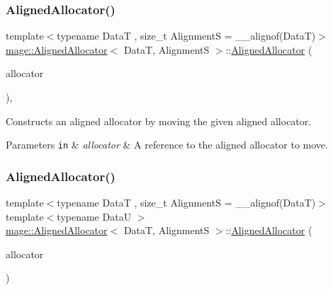 \subsubsection{\texorpdfstring{Aligned\+Allocator()}{AlignedAllocator()}\hspace{0.1cm}{\footnotesize\ttfamily [3/4]}}
{\footnotesize\ttfamily template$<$typename DataT , size\+\_\+t AlignmentS = \+\_\+\+\_\+alignof(\+Data\+T)$>$ \\
\hyperlink{structmage_1_1_aligned_allocator}{mage\+::\+Aligned\+Allocator}$<$ DataT, AlignmentS $>$\+::\hyperlink{structmage_1_1_aligned_allocator}{Aligned\+Allocator} (\begin{DoxyParamCaption}\item[{\hyperlink{structmage_1_1_aligned_allocator}{Aligned\+Allocator}$<$ DataT, AlignmentS $>$ \&\&}]{allocator }\end{DoxyParamCaption})\hspace{0.3cm}{\ttfamily [default]}, {\ttfamily [noexcept]}}

Constructs an aligned allocator by moving the given aligned allocator.


\begin{DoxyParams}[1]{Parameters}
\mbox{\tt in}  & {\em allocator} & A reference to the aligned allocator to move. \\
\hline
\end{DoxyParams}
\hypertarget{structmage_1_1_aligned_allocator_a728d237ac0ae50bcc593a94f6e4cd4fc}{}\label{structmage_1_1_aligned_allocator_a728d237ac0ae50bcc593a94f6e4cd4fc} 
\subsubsection{\texorpdfstring{Aligned\+Allocator()}{AlignedAllocator()}\hspace{0.1cm}{\footnotesize\ttfamily [4/4]}}
{\footnotesize\ttfamily template$<$typename DataT , size\+\_\+t AlignmentS = \+\_\+\+\_\+alignof(\+Data\+T)$>$ \\
template$<$typename DataU $>$ \\
\hyperlink{structmage_1_1_aligned_allocator}{mage\+::\+Aligned\+Allocator}$<$ DataT, AlignmentS $>$\+::\hyperlink{structmage_1_1_aligned_allocator}{Aligned\+Allocator} (\begin{DoxyParamCaption}\item[{const \hyperlink{structmage_1_1_aligned_allocator}{Aligned\+Allocator}$<$ DataU, AlignmentS $>$ \&}]{allocator }\end{DoxyParamCaption})\hspace{0.3cm}{\ttfamily [noexcept]}}

